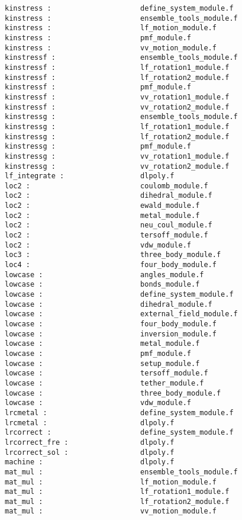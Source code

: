 \begin{verbatim}
kinstress :                     define_system_module.f
kinstress :                     ensemble_tools_module.f
kinstress :                     lf_motion_module.f
kinstress :                     pmf_module.f
kinstress :                     vv_motion_module.f
kinstressf :                    ensemble_tools_module.f
kinstressf :                    lf_rotation1_module.f
kinstressf :                    lf_rotation2_module.f
kinstressf :                    pmf_module.f
kinstressf :                    vv_rotation1_module.f
kinstressf :                    vv_rotation2_module.f
kinstressg :                    ensemble_tools_module.f
kinstressg :                    lf_rotation1_module.f
kinstressg :                    lf_rotation2_module.f
kinstressg :                    pmf_module.f
kinstressg :                    vv_rotation1_module.f
kinstressg :                    vv_rotation2_module.f
lf_integrate :                  dlpoly.f
loc2 :                          coulomb_module.f 
loc2 :                          dihedral_module.f 
loc2 :                          ewald_module.f 
loc2 :                          metal_module.f 
loc2 :                          neu_coul_module.f 
loc2 :                          tersoff_module.f 
loc2 :                          vdw_module.f 
loc3 :                          three_body_module.f 
loc4 :                          four_body_module.f 
lowcase :                       angles_module.f
lowcase :                       bonds_module.f
lowcase :                       define_system_module.f
lowcase :                       dihedral_module.f
lowcase :                       external_field_module.f
lowcase :                       four_body_module.f
lowcase :                       inversion_module.f
lowcase :                       metal_module.f
lowcase :                       pmf_module.f
lowcase :                       setup_module.f
lowcase :                       tersoff_module.f
lowcase :                       tether_module.f
lowcase :                       three_body_module.f
lowcase :                       vdw_module.f
lrcmetal :                      define_system_module.f
lrcmetal :                      dlpoly.f
lrcorrect :                     define_system_module.f
lrcorrect_fre :                 dlpoly.f
lrcorrect_sol :                 dlpoly.f
machine :                       dlpoly.f
mat_mul :                       ensemble_tools_module.f
mat_mul :                       lf_motion_module.f
mat_mul :                       lf_rotation1_module.f
mat_mul :                       lf_rotation2_module.f
mat_mul :                       vv_motion_module.f

\end{verbatim}
